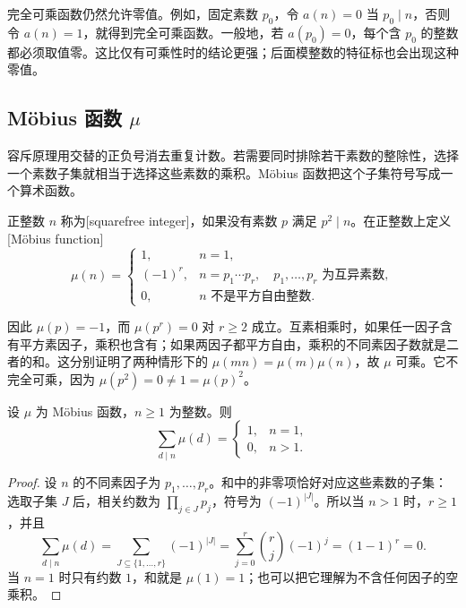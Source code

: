 完全可乘函数仍然允许零值。例如，固定素数 \(p_0\)，令 \(a(n)=0\) 当 \(p_0\mid n\)，否则令 \(a(n)=1\)，就得到完全可乘函数。一般地，若 \(a(p_0)=0\)，每个含 \(p_0\) 的整数都必须取值零。这比仅有可乘性时的结论更强；后面模整数的特征标也会出现这种零值。

\subsection{Möbius 函数 \texorpdfstring{\(\mu\)}{\AnalysisPdfMu}}
\label{b3:subsec:250103}

容斥原理用交替的正负号消去重复计数。若需要同时排除若干素数的整除性，选择一个素数子集就相当于选择这些素数的乘积。Möbius 函数把这个子集符号写成一个算术函数。

\begin{definition}\label{b3:def:25-mobius}
正整数 \(n\) 称为[squarefree integer]，如果没有素数 \(p\) 满足 \(p^2\mid n\)。在正整数上定义[Möbius function]
\[
 \mu(n)=
 \begin{cases}
  1,&n=1,\\
  (-1)^r,&n=p_1\cdots p_r,\quad p_1,\ldots,p_r\text{ 为互异素数},\\
  0,&n\text{ 不是平方自由整数}.
 \end{cases}
\]
\end{definition}

因此 \(\mu(p)=-1\)，而 \(\mu(p^r)=0\) 对 \(r\ge2\) 成立。互素相乘时，如果任一因子含有平方素因子，乘积也含有；如果两因子都平方自由，乘积的不同素因子数就是二者的和。这分别证明了两种情形下的 \(\mu(mn)=\mu(m)\mu(n)\)，故 \(\mu\) 可乘。它不完全可乘，因为 \(\mu(p^2)=0\ne1=\mu(p)^2\)。

\begin{proposition}\label{b3:prop:25-mobius-sum}
设 \(\mu\) 为 Möbius 函数，\(n\ge1\) 为整数。则
\[
 \sum_{d\mid n}\mu(d)=
 \begin{cases}1,&n=1,\\0,&n>1.\end{cases}
\]
\end{proposition}
\begin{proof}
设 \(n\) 的不同素因子为 \(p_1,\ldots,p_r\)。和中的非零项恰好对应这些素数的子集：选取子集 \(J\) 后，相关约数为 \(\prod_{j\in J}p_j\)，符号为 \((-1)^{|J|}\)。所以当 \(n>1\) 时，\(r\ge1\)，并且
\[
 \sum_{d\mid n}\mu(d)
 =\sum_{J\subseteq\{1,\ldots,r\}}(-1)^{|J|}
 =\sum_{j=0}^r\binom rj(-1)^j=(1-1)^r=0.
\]
当 \(n=1\) 时只有约数 \(1\)，和就是 \(\mu(1)=1\)；也可以把它理解为不含任何因子的空乘积。
\end{proof}

